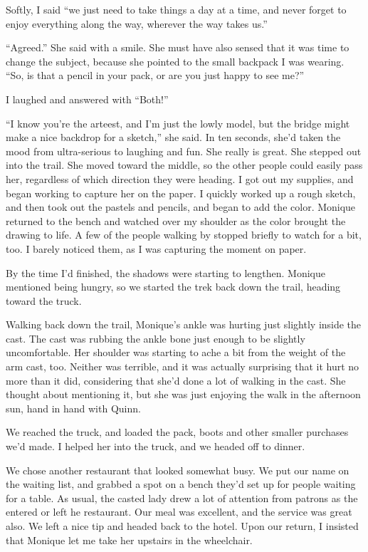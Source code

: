 Softly, I said ``we just need to take things a day at a time, and never forget to enjoy
everything along the way, wherever the way takes us.''

``Agreed.'' She said with a smile. She must have also sensed that it was time to change the
subject, because she pointed to the small backpack I was wearing. ``So, is that a pencil in your
pack, or are you just happy to see me?''

I laughed and answered with ``Both!''

``I know you're the arteest, and I'm just the lowly model, but the bridge might make a nice
backdrop for a sketch,'' she said. In ten seconds, she'd taken the mood from ultra-serious to
laughing and fun. She really is great. She stepped out into the trail. She moved toward the
middle, so the other people could easily pass her, regardless of which direction they were
heading. I got out my supplies, and began working to capture her on the paper. I quickly worked
up a rough sketch, and then took out the pastels and pencils, and began to add the color.
Monique returned to the bench and watched over my shoulder as the color brought the drawing to
life. A few of the people walking by stopped briefly to watch for a bit, too. I barely noticed
them, as I was capturing the moment on paper.

By the time I'd finished, the shadows were starting to lengthen. Monique mentioned being
hungry, so we started the trek back down the trail, heading toward the truck.

\begin{thought}
Walking back down the trail, Monique's ankle was hurting just slightly inside the cast. The
cast was rubbing the ankle bone just enough to be slightly uncomfortable. Her shoulder was
starting to ache a bit from the weight of the arm cast, too. Neither was terrible, and it was
actually surprising that it hurt no more than it did, considering that she'd done a lot of
walking in the cast. She thought about mentioning it, but she was just enjoying the walk in the
afternoon sun, hand in hand with Quinn.
\end{thought}

We reached the truck, and loaded the pack, boots and other smaller purchases we'd made. I
helped her into the truck, and we headed off to dinner.

We chose another restaurant that looked somewhat busy. We put our name on the waiting list,
and grabbed a spot on a bench they'd set up for people waiting for a table. As usual, the casted
lady drew a lot of attention from patrons as the entered or left he restaurant. Our meal was
excellent, and the service was great also. We left a nice tip and headed back to the hotel. Upon
our return, I insisted that Monique let me take her upstairs in the wheelchair.

